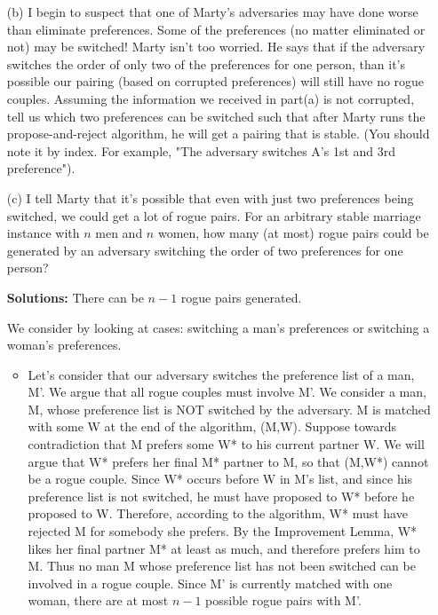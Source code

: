 \documentclass[11pt]{article}
\newif\ifsolutions
\renewcommand{\answer}[1]{{\color{mydarkblue}\textbf{Solutions: }#1}}
\begin{document}
\begin{qunlist}
\begin{itemize}
\newpage
        
\item[(b)] I begin to suspect that one of Marty's adversaries may have done worse than eliminate preferences. 
Some of the preferences (no matter eliminated or not) may be switched! Marty isn't too worried. 
He says that if the adversary switches the order of only two of the preferences for one person, 
than it's possible our pairing (based on corrupted preferences) will still have no rogue couples. 
Assuming the information we received in part(a) is not corrupted, 
tell us which two preferences can be switched such that after Marty runs the propose-and-reject algorithm, 
he will get a pairing that is stable. 
(You should note it by index. For example, "The adversary switches A's 1st and 3rd preference").

\ifsolutions
\answer{
There are three solutions. 
We can either switch Man 2's 2nd and 3rd preferences, Man 3's 2nd and 3rd preferences, 
or Woman C's 1st and 2nd preferences. 
If any of these three sets of swithes occur, the algorithm will still return no rogue couples. 
This questions is meant as an elaboration on the previous part in order to 
get you to think about how some parts of preference lists 
may not actually affect the outcome of the traditional propose-and-reject algorithm.
}
\fi

        
\item[(c)] I tell Marty that it's possible that even with just two preferences being switched, 
we could get a lot of rogue pairs. For an arbitrary stable marriage instance with $n$ men and $n$ women, 
how many (at most) rogue pairs could be generated 
by an adversary switching the order of two preferences for one person?

\ifsolutions
\answer{
There can be $n-1$ rogue pairs generated. 

We consider by looking at cases: switching a man's preferences or switching a woman's preferences. 
\begin{itemize}
\item Let's consider that our adversary switches the preference list of a man, M'. 
We argue that all rogue couples must involve M'.
We consider a man, M, whose preference list is NOT switched by the adversary. 
M is matched with some W at the end of the algorithm, (M,W). 
Suppose towards contradiction that M prefers some W* to his current partner W. 
We will argue that W* prefers her final M* partner to M, so that (M,W*) cannot be a rogue couple.  Since W* occurs before W in M's list, and since his preference list is not switched, 
he must have proposed to W* before he proposed to W. 
Therefore, according to the algorithm, W* must have rejected M for somebody she prefers. 
By the Improvement Lemma, W* likes her final partner M* at least as much, and therefore prefers him to M.
Thus no man M whose preference list has not been switched can be involved in a rogue couple. 
Since M' is currently matched with one woman, there are at most $n-1$ possible rogue pairs with M'. 


\end{itemize}}
\end{itemize}
\end{qunlist}
\end{document}
